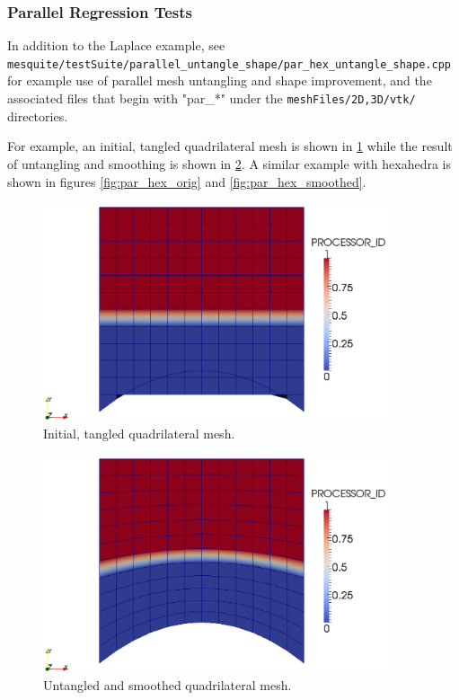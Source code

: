 \subsubsection{Parallel Regression Tests}

In addition to the Laplace example, see \\
\texttt{mesquite/testSuite/parallel\_untangle\_shape/par\_hex\_untangle\_shape.cpp} \\
for example use of parallel mesh untangling and shape improvement, and
the associated files that begin with "par\_*" under the 
\texttt{meshFiles/{2D,3D}/vtk/} directories.

For example, an initial, tangled quadrilateral mesh is shown in
\ref{fig:par_quad_orig} 
while the result of untangling and smoothing is shown in
\ref{fig:par_quad_smoothed}.  A similar example with hexahedra is
shown in figures 
\ref{fig:par_hex_orig}  and \ref{fig:par_hex_smoothed}.

\begin{figure}[htpb]
\begin{center}
\includegraphics[width=4in]{par-quad-orig.eps}
\caption{Initial, tangled quadrilateral mesh.}
\label{fig:par_quad_orig}
\end{center}
\end{figure}

\begin{figure}[htpb]
\begin{center}
\includegraphics[width=4in]{par-quad-smoothed.eps}
\caption{Untangled and smoothed quadrilateral mesh.}
\label{fig:par_quad_smoothed}
\end{center}
\end{figure}

